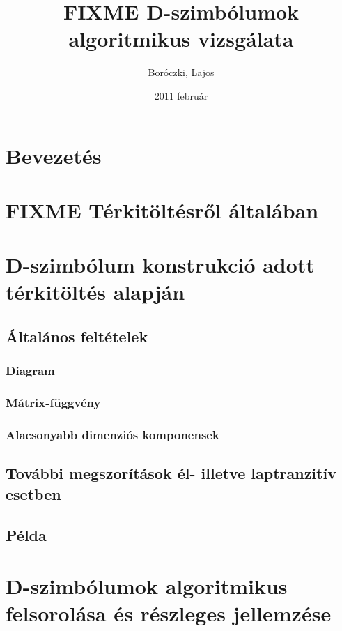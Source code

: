 \documentclass[12pt,magyar,a4paper]{article}
\begin{document}
\title{FIXME D-szimbólumok algoritmikus vizsgálata}
\author{Boróczki, Lajos}
\date{2011 február}
\maketitle

\begin{abstract}
\end{abstract}

\section{Bevezetés}

\section{FIXME Térkitöltésről általában}

\section{D-szimbólum konstrukció adott térkitöltés alapján}
\subsection{Általános feltételek}
\subsubsection{Diagram}
\subsubsection{Mátrix-függvény}
\subsubsection{Alacsonyabb dimenziós komponensek}
\subsection{További megszorítások él- illetve laptranzitív esetben}
\subsection{Példa}

\section{D-szimbólumok algoritmikus felsorolása és részleges jellemzése}
\end{document}
